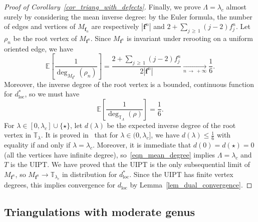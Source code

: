 \documentclass[AHL,Unicode,longabstracts,published]{cedram}
\newcommand{\loc}{\mathrm{loc}}
\newcommand{\TT}{\mathbb{T}}
\newcommand{\E}{\mathbb{E}}
\newcommand{\bff}{\mathbf{f}}
\begin{document}
\begin{proof}[Proof of Corollary~\ref{cor_triang_with_defects}]
Finally, we prove $\Lambda=\lambda_c$ almost surely by considering the mean inverse degree: by the Euler formula, the number of edges and vertices of $M_{\bff_n}$ are respectively $|\bff^n|$ and $2+\sum_{j\,\geq\,1} (j-2)f_j^n$. Let $\rho_n$ be the root vertex of $M_{\bff^n}$. Since $M_{\bff^n}$ is invariant under rerooting on a uniform oriented edge, we have
\[
\E \left[\frac{1}{\deg_{M_{\bff^n}}(\rho_n)} \right] = \frac{2+\sum_{j\,\geq\,1} (j-2)f_j^n}{2 \left|\bff^n\right|} \xrightarrow[n\,\to\,+\infty]{} \frac{1}{6}.
\]
Moreover, the inverse degree of the root vertex is a bounded, continuous function for $d_{\loc}^*$, so we must have
\begin{equation}\label{eqn_mean_degree}
\E \left[\frac{1}{\deg_{\TT_{\Lambda}}(\rho)} \right]=\frac{1}{6}.
\end{equation}
For $\lambda \in [0,\lambda_c] \cup \{\star\}$, let $d(\lambda)$ be the expected inverse degree of the root vertex in $\TT_{\lambda}$. It is proved in~\cite[Proposition~20]{BL19} that for $\lambda \in (0,\lambda_c]$, we have $d(\lambda) \leq \frac{1}{6}$ with equality if and only if $\lambda=\lambda_c$. Moreover, it is immediate that $d(0)=d(\star)=0$ (all the vertices have infinite degree), so~\eqref{eqn_mean_degree} implies $\Lambda=\lambda_c$ and $T$ is the UIPT. We have proved that the UIPT is the only subsequential limit of $M_{\bff^n}$, so $M_{\bff^n} \to \TT_{\lambda_c}$ in distribution for $d_{\loc}^*$. Since the UIPT has finite vertex degrees, this implies convergence for $d_{\loc}$ by Lemma~\ref{lem_dual_convergence}.
\end{proof}

\subsection{Triangulations with moderate genus}
\end{document}
